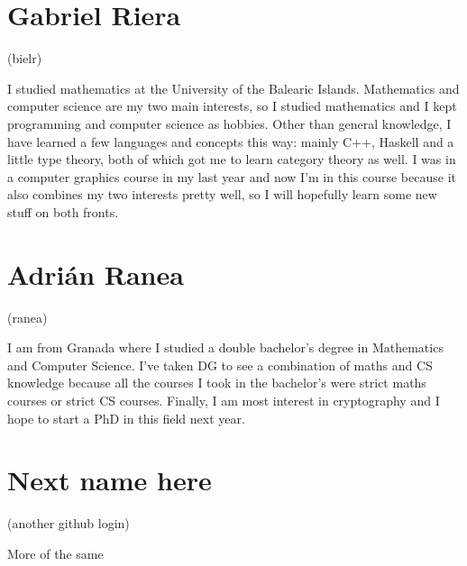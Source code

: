 \documentclass[11pt]{amsart}
\begin{document}
\medskip

\section*{Gabriel Riera}
(bielr)

I studied mathematics at the University of the Balearic Islands. Mathematics
and computer science are my two main interests, so I studied mathematics and I
kept programming and computer science as hobbies. Other than general knowledge,
I have learned a few languages and concepts this way: mainly C++, Haskell and a
little type theory, both of which got me to learn category theory as well. I
was in a computer graphics course in my last year and now I'm in this course
because it also combines my two interests pretty well, so I will hopefully
learn some new stuff on both fronts.

\medskip

\section*{Adrián Ranea}
(ranea)

I am from Granada where I studied a double bachelor's degree in Mathematics and Computer Science. I've taken DG to see a combination of maths and CS knowledge because all the courses I took in the bachelor's were strict maths courses or strict CS courses. Finally, I am most interest in cryptography and I hope to start a PhD in this field next year.

\medskip

\section*{Next name here}
(another github login)

More of the same
\end{document}
